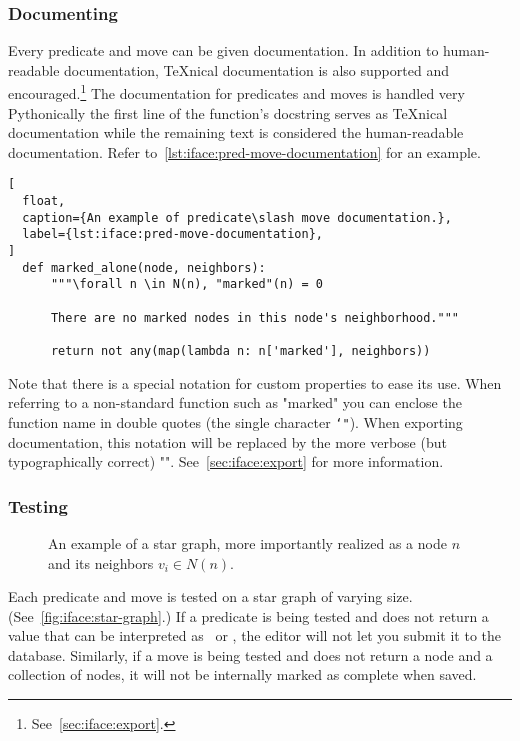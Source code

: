 \subsubsection{Documenting}
Every predicate and move can be given documentation.
In addition to human-readable documentation,
  \TeX nical documentation is also supported and encouraged.\footnote{%
    See~\autoref{sec:iface:export}.}
The documentation for predicates and moves is handled very Pythonically \Dash
  the first line of the function's docstring serves as \TeX nical documentation
  while the remaining text is considered the human-readable documentation.
Refer to~\autoref{lst:iface:pred-move-documentation} for an example.
\begin{lstlisting}[
  float,
  caption={An example of predicate\slash move documentation.},
  label={lst:iface:pred-move-documentation},
]
  def marked_alone(node, neighbors):
      """\forall n \in N(n), "marked"(n) = 0
  
      There are no marked nodes in this node's neighborhood."""
  
      return not any(map(lambda n: n['marked'], neighbors))
\end{lstlisting}

Note that there is a special notation for custom properties to ease its use.
When referring to a non-standard function
  \Dash such as "marked" \Dash
  you can enclose the function name in double quotes (the single character \texttt{\char`"}).
When exporting documentation,%
  this notation will be replaced by the more verbose
  (but typographically correct) "".
See~\autoref{sec:iface:export} for more information.

\subsubsection{Testing}

\begin{figure}
  \centering
  \caption{An example of a star graph, more importantly realized as a
    node $n$ and its neighbors $v_i \in N(n)$.}
  \label{fig:iface:star-graph}
\end{figure}
Each predicate and move is tested on a star graph of varying size.
(See~\autoref{fig:iface:star-graph}.)
If a predicate is being tested and does not return a value that
  can be interpreted as \BooleanTrueValue\ or \BooleanFalseValue,
  the editor will not let you submit it to the database.
Similarly, if a move is being tested and does not return a node and a collection of nodes,
  it will not be internally marked as complete when saved.

